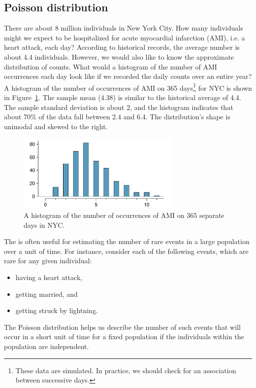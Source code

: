 \subsection{Poisson distribution}
\label{poisson}


\begin{example}{There are about 8 million individuals in New York City. How many individuals might we expect to be hospitalized for acute myocardial infarction (AMI), i.e. a heart attack, each day? According to historical records, the average number is about 4.4 individuals. However, we would also like to know the approximate distribution of counts. What would a histogram of the number of AMI occurrences each day look like if we recorded the daily counts over an entire year?} \label{amiIncidencesEachDayOver1YearInNYCExample}
A histogram of the number of occurrences of AMI on 365 days\footnote{These data are simulated. In practice, we should check for an association between successive days.} for NYC is shown in Figure~\ref{amiIncidencesOver100Days}. The sample mean (4.38) is similar to the historical average of 4.4. The sample standard deviation is about 2, and the histogram indicates that about 70\% of the data fall between 2.4 and 6.4. The distribution's shape is unimodal and skewed to the right.
\end{example}

\begin{figure}
\centering
\includegraphics[width=0.7\textwidth]{03/figures/amiIncidencesOver100Days/amiIncidencesOver100Days}
\caption{A histogram of the number of occurrences of AMI on 365 separate days in NYC.}
\label{amiIncidencesOver100Days}
\end{figure}

The  is often useful for estimating the number of rare events in a large population over a unit of time. For instance, consider each of the following events, which are rare for any given individual:
\begin{itemize}
\setlength{\itemsep}{0mm}
\item having a heart attack,
\item getting married, and
\item getting struck by lightning.
\end{itemize}
The Poisson distribution helps us describe the number of such events that will occur in a short unit of time for a fixed population if the individuals within the population are independent.

